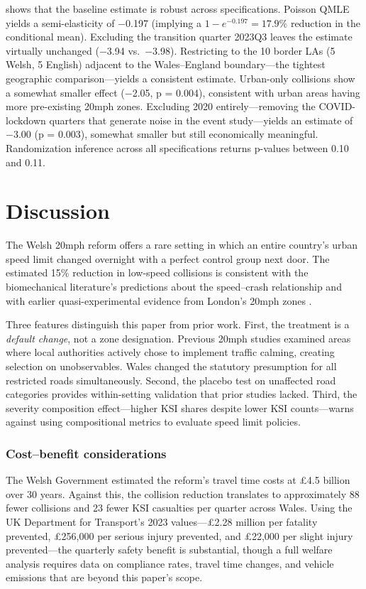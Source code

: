 \documentclass[12pt]{article}
\begin{document}


 shows that the baseline estimate is robust across specifications. Poisson QMLE yields a semi-elasticity of $-$0.197 (implying a $1 - e^{-0.197} = 17.9\%$ reduction in the conditional mean). Excluding the transition quarter 2023Q3 leaves the estimate virtually unchanged ($-$3.94 vs.\ $-$3.98). Restricting to the 10 border LAs (5 Welsh, 5 English) adjacent to the Wales--England boundary---the tightest geographic comparison---yields a consistent estimate. Urban-only collisions show a somewhat smaller effect ($-$2.05, p = 0.004), consistent with urban areas having more pre-existing 20mph zones. Excluding 2020 entirely---removing the COVID-lockdown quarters that generate noise in the event study---yields an estimate of $-$3.00 (p = 0.003), somewhat smaller but still economically meaningful. Randomization inference across all specifications returns p-values between 0.10 and 0.11.

\section{Discussion}

The Welsh 20mph reform offers a rare setting in which an entire country's urban speed limit changed overnight with a perfect control group next door. The estimated 15\% reduction in low-speed collisions is consistent with the biomechanical literature's predictions about the speed--crash relationship \citep{nilsson2004traffic, elvik2013review} and with earlier quasi-experimental evidence from London's 20mph zones \citep{grundy2009effect}.

Three features distinguish this paper from prior work. First, the treatment is a \emph{default change}, not a zone designation. Previous 20mph studies examined areas where local authorities actively chose to implement traffic calming, creating selection on unobservables. Wales changed the statutory presumption for all restricted roads simultaneously. Second, the placebo test on unaffected road categories provides within-setting validation that prior studies lacked. Third, the severity composition effect---higher KSI shares despite lower KSI counts---warns against using compositional metrics to evaluate speed limit policies.

\subsubsection*{Cost--benefit considerations} The Welsh Government estimated the reform's travel time costs at \pounds4.5 billion over 30 years. Against this, the collision reduction translates to approximately 88 fewer collisions and 23 fewer KSI casualties per quarter across Wales. Using the UK Department for Transport's 2023 values---\pounds2.28 million per fatality prevented, \pounds256,000 per serious injury prevented, and \pounds22,000 per slight injury prevented---the quarterly safety benefit is substantial, though a full welfare analysis requires data on compliance rates, travel time changes, and vehicle emissions that are beyond this paper's scope.
\end{document}
